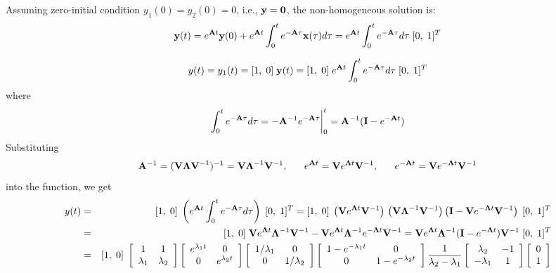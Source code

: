 \begin{itemize}
  Assuming zero-initial condition $y_1(0)=y_2(0)=0$, i.e., ${\bf y}={\bf 0}$,
  the non-homogeneous solution is:
  \[
  {\bf y}(t)=e^{{\bf A}t}{\bf y}(0)+e^{{\bf A}t}\int_0^t e^{-{\bf A}\tau}{\bf x}(\tau)d\tau
  =e^{{\bf A}t}\int_0^t e^{-{\bf A}\tau} d\tau \;[0,\;1]^T
  \]

  \[
  y(t)=y_1(t)=[1,\;0]\;{\bf y}(t)=[1,\;0]\; e^{{\bf A}t}\int_0^t e^{-{\bf A}\tau} d\tau\; [0,\;1]^T
  \]
  where 
  \[
  \int_0^t e^{-{\bf A}\tau} d\tau=-{\bf A}^{-1} e^{-{\bf A}\tau}\bigg|_0^t
  ={\bf A}^{-1}( {\bf I}-e^{-{\bf A}t} )
  \]
  Substituting 
  \[
  {\bf A}^{-1}=({\bf V\Lambda V}^{-1})^{-1}={\bf V\Lambda}^{-1}{\bf V}^{-1},
  \;\;\;\;\;\;
  e^{{\bf A}t}={\bf V}e^{{\bf\Lambda}t}{\bf V}^{-1},\;\;\;\;\;\;
  e^{-{\bf A}t}={\bf V}e^{-{\bf\Lambda}t}{\bf V}^{-1}
  \]
  into the function, we get
%  
  \begin{eqnarray}
  y(t)&=&[1,\;0]\;\left(e^{{\bf A}t}\int_0^t e^{-{\bf A}\tau} d\tau\right)\;[0,\;1]^T
  =[1,\;0]\;\left({\bf V}e^{{\bf\Lambda}t}{\bf V}^{-1}\right)\,
  \left({\bf V\Lambda}^{-1}{\bf V}^{-1}\right)
  \left({\bf I}-{\bf V}e^{-{\bf\Lambda}t}{\bf V}^{-1}\right)\;[0,\;1]^T
  \nonumber\\
  &=&[1,\;0]\;{\bf V}e^{{\bf\Lambda}t} {\bf \Lambda}^{-1}{\bf V}^{-1}
  -{\bf V}e^{{\bf\Lambda}t}{\bf\Lambda}^{-1}  e^{-{\bf\Lambda}t}{\bf V}^{-1}
  ={\bf V}e^{{\bf\Lambda}t}{\bf\Lambda}^{-1}({\bf I}-e^{-{\bf\Lambda}t} ){\bf V}^{-1}
  \;[0,\;1]^T
  \nonumber\\
  &=&[1,\;0]\;\left[\begin{array}{cc}1&1\\\lambda_1&\lambda_2\end{array}\right]
  \left[\begin{array}{cc}e^{\lambda_1t}&0\\0&e^{\lambda_2t}\end{array}\right]
  \left[\begin{array}{cc}1/\lambda_1&0\\0&1/\lambda_2\end{array}\right]
  \left[\begin{array}{cc} 1-e^{-\lambda_1t} & 0\\0 & 1-e^{-\lambda_2t}\end{array}\right]
  \frac{1}{\lambda_2-\lambda_1}
  \left[\begin{array}{cc}\lambda_2&-1\\-\lambda_1&1\end{array}\right]
  \left[\begin{array}{c}0\\1\end{array}\right]

\end{eqnarray}
\end{itemize}
